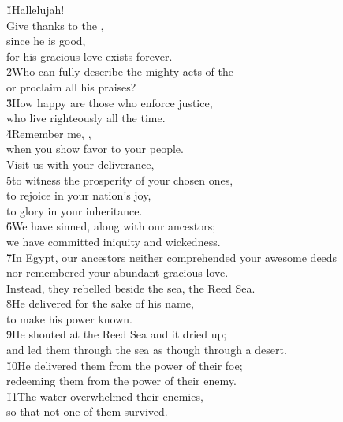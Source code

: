 \begin{poetry}
\poeml \v{1}Hallelujah! \\
\poeml Give thanks to the , \\
\poemll    since he is good, \\
\poemlll       for his gracious love exists forever. \\
\poeml \v{2}Who can fully describe the mighty acts of the  \\
\poemll    or proclaim all his praises? \\
\poeml \v{3}How happy are those who enforce justice, \\
\poemll    who live righteously all the time. \\
\poeml \v{4}Remember me, , \\
\poemll    when you show favor to your people. \\
\poeml Visit us with your deliverance, \\
\poeml \v{5}to witness the prosperity of your chosen ones, \\
\poeml to rejoice in your nation's joy, \\
\poemll    to glory in your inheritance. \\
\poeml \v{6}We have sinned, along with our ancestors; \\
\poemll    we have committed iniquity and wickedness. \\
\poeml \v{7}In Egypt, our ancestors neither comprehended your awesome deeds \\
\poemll    nor remembered your abundant gracious love. \\
\poemlll       Instead, they rebelled beside the sea, the Reed Sea. \\
\poeml \v{8}He delivered for the sake of his name, \\
\poemll    to make his power known. \\
\poeml \v{9}He shouted at the Reed Sea and it dried up; \\
\poemll    and led them through the sea as though through a desert. \\
\poeml \v{10}He delivered them from the power of their foe; \\
\poemll    redeeming them from the power of their enemy. \\
\poeml \v{11}The water overwhelmed their enemies, \\
\poemll    so that not one of them survived. \\

\end{poetry}
